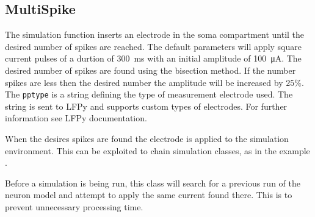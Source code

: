 \documentclass[altfont, fleqn]{uiophd}
\renewcommand{\cref}[1]{{\color{viridis_03}\mycref{#1}}}
\begin{document}
\begin{appendices}
\subsection{MultiSpike}
\label{sec:multispike}
The simulation function inserts an electrode in the soma
compartment until the desired number of spikes are reached. 
The default parameters will apply square current pulses
of a durtion of 
\SI{300}{\milli\second}
with an initial amplitude of 
\SI{100}{\micro\ampere}. 
The desired number of spikes are found using 
the bisection method. 
If the number spikes are less
then the desired number the amplitude will be increased by 
$25\%$. 
The 
\verb+pptype+ 
is a string defining the type of measurement electrode used. 
The string is sent to LFPy and supports custom
types of electrodes. 
For further information see LFPy documentation.

When the desires spikes are found 
the electrode is applied to the simulation environment. 
This can be exploited to chain simulation classes, 
as in the example \cref{code:simulator}.

Before a simulation is being run, this
class will search for a previous run
of the neuron model and attempt to apply the
same current found there.
This is to prevent unnecessary processing time.
\newline

\end{appendices}
\end{document}
